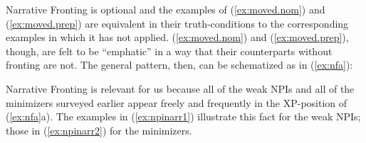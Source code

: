 \documentclass[output=paper,colorlinks,citecolor=brown]{langscibook}
\begin{document}

\noindent Narrative Fronting is optional and the examples of (\ref{ex:moved.nom}) and (\ref{ex:moved.prep}) are equivalent in their truth-conditions to the corresponding examples in which it has not applied. (\ref{ex:moved.nom}) and (\ref{ex:moved.prep}), though, are felt to be “emphatic” in a way that their counterparts without fronting are not.  The general pattern, then, can be schematized as in (\ref{ex:nfa}):



Narrative Fronting is relevant for us because all of the weak NPIs and all of the minimizers surveyed earlier appear freely and frequently in the XP-position of  (\ref{ex:nfa}a). The examples in (\ref{ex:npinarr1}) illustrate this fact for the weak NPIs; those in (\ref{ex:npinarr2}) for the minimizers.
\end{document}
